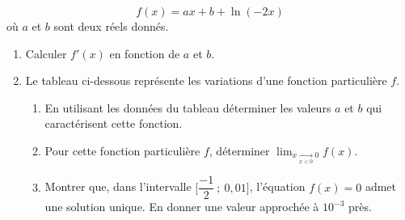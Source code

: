 	\[
	  f(x)=ax+b+\ln(-2x)
	\]
	où $a$ et $b$ sont deux réels donnés.

	\begin{enumerate}
	\item Calculer $f'(x)$ en fonction de $a$ et $b$.
	\item Le tableau ci-dessous représente les variations d'une fonction particulière $f$.

	\medskip
	\begin{center}
	\end{center}

	\medskip
	\begin{enumerate}
	\item En utilisant les données du tableau déterminer les valeurs $a$ et $b$ qui caractérisent
	 cette fonction.
	\item Pour cette fonction particulière $f$, déterminer 
	        $\displaystyle \lim_{x \xrightarrow[x<0]{} 0} f(x)$.
	\item Montrer que, dans l'intervalle $\Big[\dfrac{-1}{2}~;~0,01\Big]$, l'équation $f(x)=0$
	 admet une solution unique. En donner une valeur approchée à $10^{-3}$ près.
	\end{enumerate}
	\end{enumerate}
	
